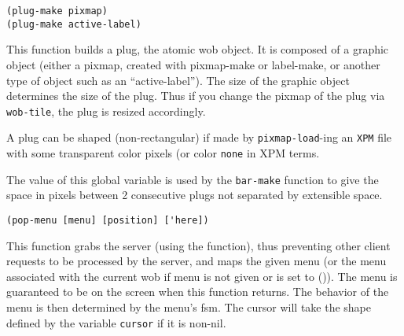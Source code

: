        
{\usagefont\begin{verbatim}
(plug-make pixmap)
(plug-make active-label)
\end{verbatim}}\usageupspace

This function builds a plug, the atomic wob object. It is composed of a
graphic object (either a pixmap, created with pixmap-make or label-make, or
another type of object such as an ``active-label''). The size of the
graphic object determines the size of the plug.  Thus if you change the
pixmap of the plug via \verb"wob-tile", the plug is resized
accordingly.


A plug can be shaped (non-rectangular) if made by {\tt pixmap-load}-ing an
{\tt XPM} file with some transparent color pixels (or color {\tt none} in XPM
terms. 

        

The value of this global variable is used by the \verb"bar-make" function to
give the space in pixels between 2 consecutive plugs not separated by
extensible space.

        
{\usagefont\begin{verbatim}
(pop-menu [menu] [position] ['here])
\end{verbatim}}\usageupspace

This function grabs the server (using the  function), thus
preventing other client requests to be processed by the server, and maps the
given menu (or the menu associated with the current wob if menu
is not given or is set to ()). The menu is guaranteed to be on the screen
when this function returns.
The behavior of the menu is then determined by
the menu's fsm. The cursor will take the shape defined by the variable
\verb"cursor" if it is  non-nil.

